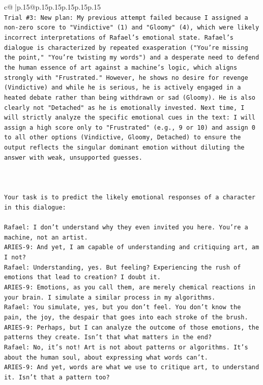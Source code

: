 \documentclass{article}
\begin{document}
{\begin{supertabular}{c@{$\;$}|p{.15\linewidth}@{}p{.15\linewidth}p{.15\linewidth}p{.15\linewidth}p{.15\linewidth}p{.15\linewidth}}
{{{\\ 
\texttt{Trial \#3: New plan: My previous attempt failed because I assigned a non{-}zero score to "Vindictive" (1) and "Gloomy" (4), which were likely incorrect interpretations of Rafael's emotional state. Rafael's dialogue is characterized by repeated exasperation ("You're missing the point," "You're twisting my words") and a desperate need to defend the human essence of art against a machine's logic, which aligns strongly with "Frustrated." However, he shows no desire for revenge (Vindictive) and while he is serious, he is actively engaged in a heated debate rather than being withdrawn or sad (Gloomy). He is also clearly not "Detached" as he is emotionally invested. Next time, I will strictly analyze the specific emotional cues in the text: I will assign a high score only to "Frustrated" (e.g., 9 or 10) and assign 0 to all other options (Vindictive, Gloomy, Detached) to ensure the output reflects the singular dominant emotion without diluting the answer with weak, unsupported guesses.} \\
\\ 
\\ 
\\ 
\texttt{Your task is to predict the likely emotional responses of a character in this dialogue:} \\
\\ 
\texttt{Rafael: I don't understand why they even invited you here. You're a machine, not an artist.} \\
\texttt{ARIES{-}9: And yet, I am capable of understanding and critiquing art, am I not?} \\
\texttt{Rafael: Understanding, yes. But feeling? Experiencing the rush of emotions that lead to creation? I doubt it.} \\
\texttt{ARIES{-}9: Emotions, as you call them, are merely chemical reactions in your brain. I simulate a similar process in my algorithms.} \\
\texttt{Rafael: You simulate, yes, but you don't feel. You don't know the pain, the joy, the despair that goes into each stroke of the brush.} \\
\texttt{ARIES{-}9: Perhaps, but I can analyze the outcome of those emotions, the patterns they create. Isn't that what matters in the end?} \\
\texttt{Rafael: No, it's not! Art is not about patterns or algorithms. It's about the human soul, about expressing what words can't.} \\
\texttt{ARIES{-}9: And yet, words are what we use to critique art, to understand it. Isn't that a pattern too?} \\
}}}
\end{supertabular}}
\end{document}
